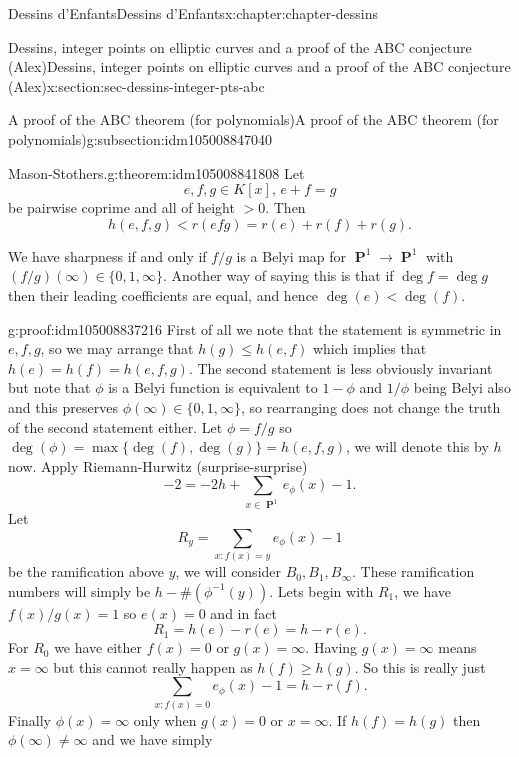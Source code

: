\documentclass[oneside,10pt,]{book}
\numberwithin{equation}{section}
\newcommand{\inv}{^{-1}}
\DeclareMathOperator{\PP}{\mathbf{P}}
\newcommand{\lt}{<}
\newcommand{\gt}{>}
\begin{document}
\begin{chapterptx}{Dessins d'Enfants}{}{Dessins d'Enfants}{}{}{x:chapter:chapter-dessins}
\begin{sectionptx}{Dessins, integer points on elliptic curves and a proof of the ABC conjecture (Alex)}{}{Dessins, integer points on elliptic curves and a proof of the ABC conjecture (Alex)}{}{}{x:section:sec-dessins-integer-pts-abc}
\begin{subsectionptx}{A proof of the ABC theorem (for polynomials)}{}{A proof of the ABC theorem (for polynomials)}{}{}{g:subsection:idm105008847040}
\begin{theorem}{Mason-Stothers.}{}{g:theorem:idm105008841808}
Let%
\begin{equation*}
e,f,g\in K[x],\,e + f = g
\end{equation*}
be pairwise coprime and all of height \(\gt 0\). Then%
\begin{equation*}
h(e,f,g) \lt r(efg) = r(e) + r(f)  + r(g)\text{.}
\end{equation*}
%
\par
We have sharpness if and only if \(f/g\) is a Belyi map for \(\PP^1 \to \PP^1\) with \((f/g)(\infty) \in \{0,1,\infty\}\). Another way of saying this is that if \(\deg f = \deg g\) then their leading coefficients are equal, and hence \(\deg (e) \lt \deg (f)\).%
\end{theorem}
\begin{proofptx}{}{g:proof:idm105008837216}
First of all we note that the statement is symmetric in \(e,f,g\), so we may arrange that \(h(g) \le h(e,f)\) which implies that \(h(e) = h(f) = h(e,f,g)\). The second statement is less obviously invariant but note that \(\phi\) is  a Belyi function is equivalent to \(1-\phi\) and \(1/\phi\) being Belyi also and this preserves \(\phi(\infty) \in \{0,1,\infty\}\), so rearranging does not change the truth of the second statement either. Let \(\phi = f/g\) so \(\deg(\phi) = \max\{\deg (f), \deg(g)\} = h(e,f,g)\), we will denote this by \(h\) now. Apply Riemann-Hurwitz (surprise-surprise)%
\begin{equation*}
-2 = -2h + \sum_{x\in \PP^1} e_\phi(x) - 1\text{.}
\end{equation*}
Let%
\begin{equation*}
R_y = \sum_{x : f(x) = y} e_\phi(x) - 1
\end{equation*}
be the ramification above \(y\), we will consider \(B_0, B_1, B_\infty\). These ramification numbers will simply be \(h - \#(\phi\inv(y))\). Lets begin with \(R_1\), we have \(f(x)/g(x) = 1\) so \(e(x) = 0\) and in fact%
\begin{equation*}
R_1 = h(e) - r(e) = h - r(e)\text{.}
\end{equation*}
For \(R_0\) we have either \(f(x) = 0\) or \(g(x) = \infty\). Having \(g(x) = \infty\) means \(x = \infty\) but this cannot really happen as \(h(f) \ge h(g)\). So this is really just%
\begin{equation*}
\sum_{x : f(x) = 0} e_\phi(x) - 1 = h  - r(f)\text{.}
\end{equation*}
Finally \(\phi(x) = \infty\) only when \(g(x) = 0\) or \(x = \infty\). If \(h(f) = h(g)\) then \(\phi(\infty) \ne \infty\) and we have simply%
\begin{equation*}

\end{equation*}
\end{proofptx}
\end{subsectionptx}
\end{sectionptx}
\end{chapterptx}
\end{document}
